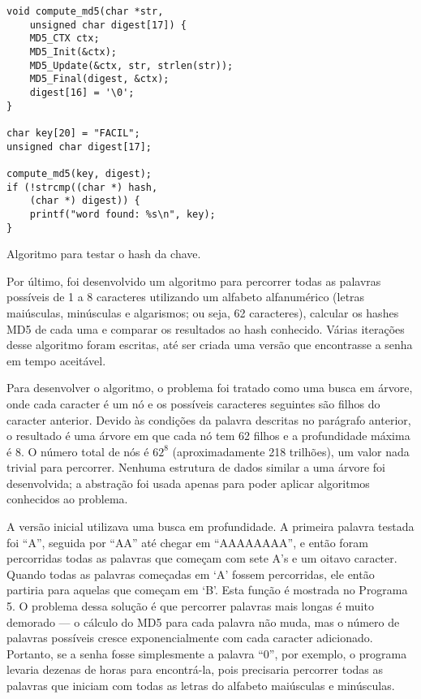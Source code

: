 \documentclass{sig-alternate-05-2015}
\begin{document}
\begin{program}
\begin{lstlisting}
void compute_md5(char *str, 
	unsigned char digest[17]) {
    MD5_CTX ctx;
    MD5_Init(&ctx);
    MD5_Update(&ctx, str, strlen(str));
    MD5_Final(digest, &ctx);
    digest[16] = '\0';
}

char key[20] = "FACIL";
unsigned char digest[17];

compute_md5(key, digest);
if (!strcmp((char *) hash,
	(char *) digest)) {
    printf("word found: %s\n", key);
}
\end{lstlisting}
\caption{Algoritmo para testar o hash da chave.}
\end{program}

Por último, foi desenvolvido um algoritmo para percorrer todas as palavras possíveis de 1 a 8 caracteres utilizando um alfabeto alfanumérico (letras maiúsculas, minúsculas e algarismos; ou seja, 62 caracteres), calcular os hashes MD5 de cada uma e comparar os resultados ao hash conhecido.
Várias iterações desse algoritmo foram escritas, até ser criada uma versão que encontrasse a senha em tempo aceitável.

Para desenvolver o algoritmo, o problema foi tratado como uma busca em árvore, onde cada caracter é um nó e os possíveis caracteres seguintes são filhos do caracter anterior.
Devido às condições da palavra descritas no parágrafo anterior, o resultado é uma árvore em que cada nó tem 62 filhos e a profundidade máxima é 8.
O número total de nós é $62^8$ (aproximadamente 218 trilhões), um valor nada trivial para percorrer.
Nenhuma estrutura de dados similar a uma árvore foi desenvolvida; a abstração foi usada apenas para poder aplicar algoritmos conhecidos ao problema.

A versão inicial utilizava uma busca em profundidade.
A primeira palavra testada foi ``A'', seguida por ``AA'' até chegar em ``AAAAAAAA'', e então foram percorridas todas as palavras que começam com sete A's e um oitavo caracter.
Quando todas as palavras começadas em `A' fossem percorridas, ele então partiria para aquelas que começam em `B'.
Esta função é mostrada no Programa 5.
O problema dessa solução é que percorrer palavras mais longas é muito demorado — o cálculo do MD5 para cada palavra não muda, mas o número de palavras possíveis cresce exponencialmente com cada caracter adicionado.
Portanto, se a senha fosse simplesmente a palavra ``0'', por exemplo, o programa levaria dezenas de horas para encontrá-la, pois precisaria percorrer  todas as palavras que iniciam com todas as letras do alfabeto maiúsculas e minúsculas.
\end{document}
